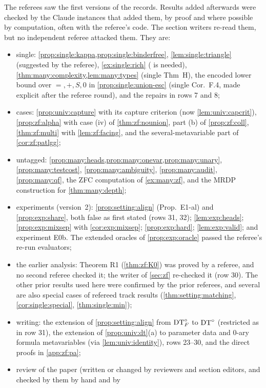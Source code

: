 The referees saw the first versions of the records. Results added afterwards were checked by the Claude instances that added them, by proof and
where possible by computation, often with the referee's code. The section writers re-read them, but no independent
referee attacked them. They are:
\begin{itemize}
\item single: \cref{prop:single:kappa,prop:single:binderfree}, \cref{lem:single:triangle} (suggested by the referee),
  \cref{ex:single:rich} (\Rich{} is needed), \cref{thm:many:complexity,lem:many:types} (single Thm~H), the encoded
  lower bound over $=,+,S,0$ in \cref{prop:single:union-esc} (single Cor.~F.4, made explicit after the referee round),
  and the repairs in rows 7 and 8;
\item cases: \cref{prop:univ:capture} with its capture criterion (now \cref{lem:univ:capcrit}), \cref{prop:zf:alpha}
  with case (iv) of \cref{thm:zf:nounion}, part (b) of \cref{prop:zf:coll}, \cref{thm:zf:multi} with
  \cref{lem:zf:facing}, and the several-metavariable part of \cref{cor:zf:patlgg};
\item untagged: \cref{prop:many:heads,prop:many:onevar,prop:many:unary}, \cref{prop:many:testcost},
  \cref{prop:many:ambiguity}, \cref{prop:many:audit}, \cref{prop:many:qf}, the ZFC computation of
  \cref{ex:many:zf}, and the MRDP construction for \cref{thm:many:depth};
\item experiments (version~2): \cref{prop:setting:align} (Prop.~E1-al) and \cref{prop:exp:share}, both false as first
  stated (rows 31, 32); \cref{lem:exp:heads}; \cref{prop:exp:mixsep} with \cref{cor:exp:mixsep};
  \cref{prop:exp:hard}; \cref{lem:exp:valid}; and experiment E0b. The
  extended oracles of \cref{prop:exp:oracle} passed the referee's re-run evaluators;
\item the earlier analysis: Theorem R1 (\cref{thm:zf:K0}) was proved by a referee, and no second referee checked it; the writer of
  \cref{sec:zf} re-checked it (row 30). The other prior results used here were confirmed by the prior referees, and
  several are also special cases of refereed track results (\cref{thm:setting:matching}, \cref{cor:single:special},
  \cref{thm:single:min});
\item writing: the extension of \cref{prop:setting:align} from $\mathrm{DT}^{\circ}_{F}$ to $\mathrm{DT}^{\circ}$ (restricted as in row 31), the
  extension of \cref{prop:univ:dt}(a) to parameter data and $0$-ary formula metavariables (via \cref{lem:univ:identity}),
  rows 23--30, and the direct proofs in \cref{app:zf:pa};
\item review of the paper (written or changed by reviewers and section editors, and checked by them by hand and by

\end{itemize}
